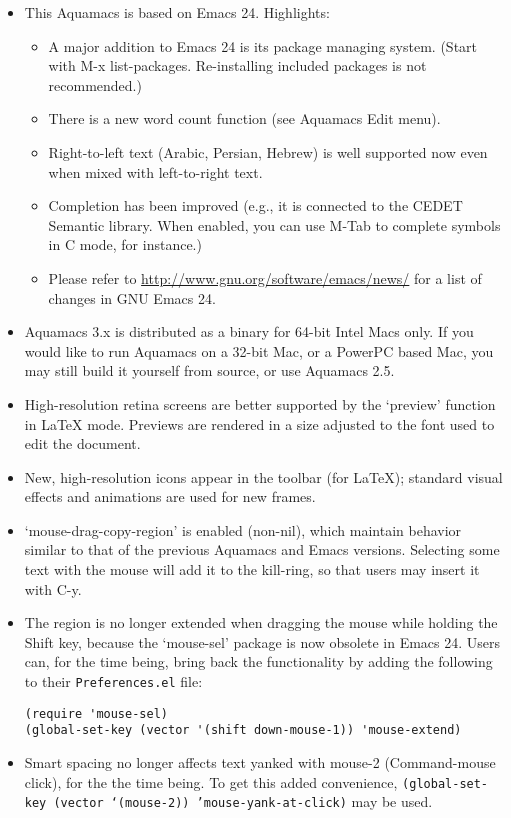 \begin{itemize}
\item This Aquamacs is based on Emacs 24. Highlights:
\begin{itemize} 
\item A major addition to Emacs 24 is its package managing system.  (Start with M-x list-packages.  Re-installing included packages is not recommended.)
\item There is a new word count function (see Aquamacs Edit menu).
\item Right-to-left text (Arabic, Persian, Hebrew) is well supported now even when mixed with left-to-right text.
\item Completion has been improved (e.g., it is connected to the CEDET Semantic library.  When enabled, you can use M-Tab to complete symbols in C mode, for instance.)
\item Please refer to \url{http://www.gnu.org/software/emacs/news/} for a list of changes in GNU Emacs 24.
\end{itemize}
\item Aquamacs 3.x is distributed as a binary for 64-bit Intel Macs only.  If you would like to run Aquamacs on a 32-bit Mac, or a PowerPC based Mac, you may still build it yourself from source, or use Aquamacs 2.5.
\item High-resolution retina screens are better supported by the `preview' function in LaTeX mode.  Previews are rendered in a size adjusted to the font used to edit the document.
\item New, high-resolution icons appear in the toolbar (for LaTeX); standard visual effects and animations are used for new frames.
\item `mouse-drag-copy-region' is enabled (non-nil), which maintain behavior similar to that of the previous Aquamacs and Emacs versions.  Selecting some text with the mouse will add it to the kill-ring, so that users may insert it with C-y.
\item The region is no longer extended when dragging the mouse while holding the Shift key, because the `mouse-sel' package is now obsolete in Emacs 24.  Users can, for the time being, bring back the functionality by adding the following to their {\tt Preferences.el} file:
\begin{verbatim}
(require 'mouse-sel) 
(global-set-key (vector '(shift down-mouse-1)) 'mouse-extend)
\end{verbatim}
\item Smart spacing no longer affects text yanked with mouse-2 (Command-mouse click), for the the time being.  To get this added convenience, {\tt (global-set-key (vector `(mouse-2)) 'mouse-yank-at-click)} may be used.

\end{itemize}
